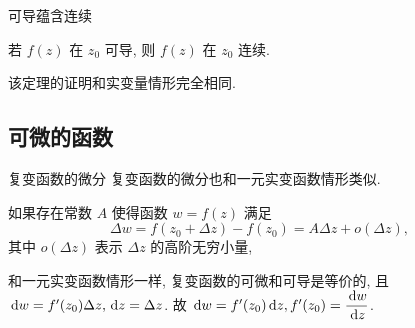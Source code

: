 \begin{frame}{可导蕴含连续}
\onslide<+->
\begin{theorem}
若 $f(z)$ 在 $z_0$ 可导, 则 $f(z)$ 在 $z_0$ 连续.
\end{theorem}
\onslide<+->
\begin{proofs}
该定理的证明和实变量情形完全相同.
\end{proofs}
\end{frame}


\subsection{可微的函数}
\begin{frame}{复变函数的微分}
\onslide<+->
复变函数的微分也和一元实变函数情形类似.
\onslide<+->
\begin{definition}
如果存在常数 $A$ 使得函数 $w=f(z)$ 满足
\[\Delta w=f(z_0+\Delta z)-f(z_0)=A\Delta z+o(\Delta z),\]
其中 $o(\Delta z)$ 表示 $\Delta z$ 的高阶无穷小量,
\end{definition}
\onslide<+->
和一元实变函数情形一样, 复变函数的可微和可导是等价的, 且 $\,\mathrm{d} w=f'(z_0)\Delta z, \,\mathrm{d} z=\Delta z$.
\onslide<+->
故 \emph{$\,\mathrm{d} w=f'(z_0)\,\mathrm{d} z,f'(z_0)=\dfrac{\,\mathrm{d} w}{\,\mathrm{d} z}$}.
\end{frame}



